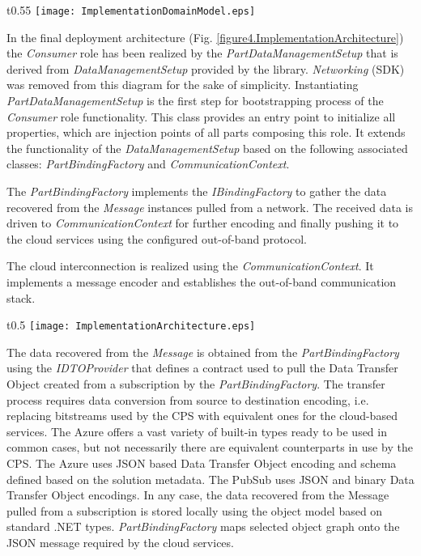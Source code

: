 \documentclass[runningheads]{llncs}
\begin{document}
\begin{wrapfigure}{t}{0.55\textwidth}
      \texttt{[image: ImplementationDomainModel.eps]}
      \caption{Architecture Domain Model}\label{figure3.ImplementationDomainModel}
\end{wrapfigure}


In the final deployment architecture (Fig. \ref{figure4.ImplementationArchitecture}) the \emph{Consumer} role has been realized by the \emph{PartDataManagementSetup} that is derived from \emph{DataManagementSetup} provided by the library. \emph{Networking} (SDK) was removed from this diagram for the sake of simplicity. Instantiating \emph{PartDataManagementSetup} is the first step for bootstrapping process of the \emph{Consumer} role functionality. This class provides an entry point to initialize all properties, which are injection points of all parts composing this role. It extends the functionality of the \emph{DataManagementSetup} based on the following associated classes: \emph{PartBindingFactory} and \emph{CommunicationContext}.

The \emph{PartBindingFactory} implements the \emph{IBindingFactory} to gather the data recovered from the \emph{Message} instances pulled from a network. The received data is driven to \emph{CommunicationContext} for further encoding and finally pushing it to the cloud services using the configured out-of-band protocol.

The cloud interconnection is realized using the \emph{CommunicationContext}. It implements a message encoder and establishes the out-of-band communication stack.

\begin{wrapfigure}{t}{0.5\textwidth}
      \texttt{[image: ImplementationArchitecture.eps]}
      \caption{Implementation Architecture}\label{figure4.ImplementationArchitecture}
\end{wrapfigure}

The data recovered from the \emph{Message} is obtained from the \emph{PartBindingFactory} using the \emph{IDTOProvider} that defines a contract used to pull the Data Transfer Object created from a subscription by the \emph{PartBindingFactory}. The transfer process requires data conversion from source to destination encoding, i.e. replacing bitstreams used by the CPS with equivalent ones for the cloud-based services. The Azure offers a vast variety of built-in types ready to be used in common cases, but not necessarily there are equivalent counterparts in use by the CPS. The Azure uses JSON based Data Transfer Object encoding and schema defined based on the solution metadata. The PubSub uses JSON and binary Data Transfer Object encodings. In any case, the data recovered from the Message pulled from a subscription is stored locally using the object model based on standard .NET types. \emph{PartBindingFactory} maps selected object graph onto the JSON message required by the cloud services.
\end{document}
